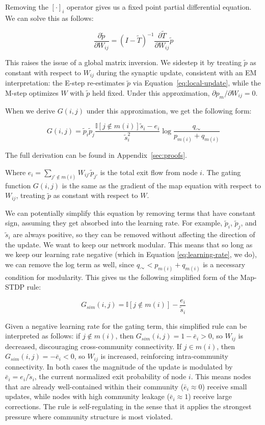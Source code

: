 \documentclass[pdflatex,sn-mathphys-num]{sn-jnl}%
\theoremstyle{thmstyleone}%
\theoremstyle{thmstyletwo}%
\theoremstyle{thmstylethree}%
\begin{document}
Removing the $[\cdot]_i$ operator gives us a fixed point partial differential equation. We can solve this as follows:

$$\frac{\partial \tilde{p}}{\partial W_{ij}} = (I - \tilde{T})^{-1} \frac{\partial \tilde{T}}{\partial W_{ij}} \tilde{p}$$

This raises the issue of a global matrix inversion. We sidestep it by treating $\tilde{p}$ as constant with respect to $W_{ij}$ during the synaptic update, consistent with an EM interpretation: the E-step re-estimates $\tilde{p}$ via Equation~\ref{eq:local-update}, while the M-step optimizes $W$ with $\tilde{p}$ held fixed. Under this approximation, $\partial p_m / \partial W_{ij} = 0$.

When we derive $G(i, j)$ under this approximation, we get the following form:

$$G(i, j) = \tilde{p}_i \tilde{p}_j \frac{\mathbb{I}[j \notin m(i)] \tilde{s}_i - e_i}{\tilde{s}_i^2} \log \frac{q_{\curvearrowright}}{p_{m(i)} + q_{m(i)}}$$

The full derivation can be found in Appendix~\ref{sec:proofs}.

Where $e_i = \sum_{j' \notin m(i)} W_{ij'} \tilde{p}_{j'}$ is the total exit flow from node $i$. The gating function $G(i, j)$ is the same as the gradient of the map equation with respect to $W_{ij}$, treating $\tilde{p}$ as constant with respect to $W$.

We can potentially simplify this equation by removing terms that have constant sign, assuming they get absorbed into the learning rate. For example, $\tilde{p}_i$, $\tilde{p}_j$, and $\tilde{s}_i$ are always positive, so they can be removed without affecting the direction of the update. We want to keep our network modular. This means that so long as we keep our learning rate negative (which in Equation \ref{eq:learning-rate}, we do), we can remove the log term as well, since $q_{\curvearrowright} < p_{m(i)} + q_{m(i)}$ is a necessary condition for modularity. This gives us the following simplified form of the Map-STDP rule:

\begin{equation}
G_{sim}(i, j) = \mathbb{I}[j \notin m(i)] - \frac{e_i}{\tilde{s}_i}
\end{equation}

Given a negative learning rate for the gating term, this simplified rule can be interpreted as follows: if $j \notin m(i)$, then $G_{sim}(i, j) = 1 - \bar{e}_i > 0$, so $W_{ij}$ is decreased, discouraging cross-community connectivity. If $j \in m(i)$, then $G_{sim}(i, j) = -\bar{e}_i < 0$, so $W_{ij}$ is increased, reinforcing intra-community connectivity. In both cases the magnitude of the update is modulated by $\bar{e}_i = e_i / \tilde{s}_i$, the current normalized exit probability of node $i$. This means nodes that are already well-contained within their community ($\bar{e}_i \approx 0$) receive small updates, while nodes with high community leakage ($\bar{e}_i \approx 1$) receive large corrections. The rule is self-regulating in the sense that it applies the strongest pressure where community structure is most violated.
\end{document}
